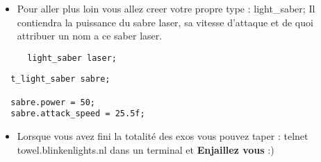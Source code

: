 \documentclass{koala-en}
\begin{document}
\begin{itemize}
  \item
Pour aller plus loin vous allez creer votre propre type : light\_saber;
Il contiendra la puissance du sabre laser, sa vitesse d'attaque et de quoi attribuer un nom a ce saber laser.
\begin{lstlisting}
  light_saber laser;
\end{lstlisting}
\end{itemize}
\begin{lstlisting}
  t_light_saber sabre;

  sabre.power = 50;
  sabre.attack_speed = 25.5f;
\end{lstlisting}

\begin{itemize}
    \item
        
        Lorsque vous avez fini la totalité des exos vous pouvez taper : telnet towel.blinkenlights.nl dans un terminal et \textbf{Enjaillez vous} :)
\end{itemize}
\thispagestyle{fancy}
\end{document}
